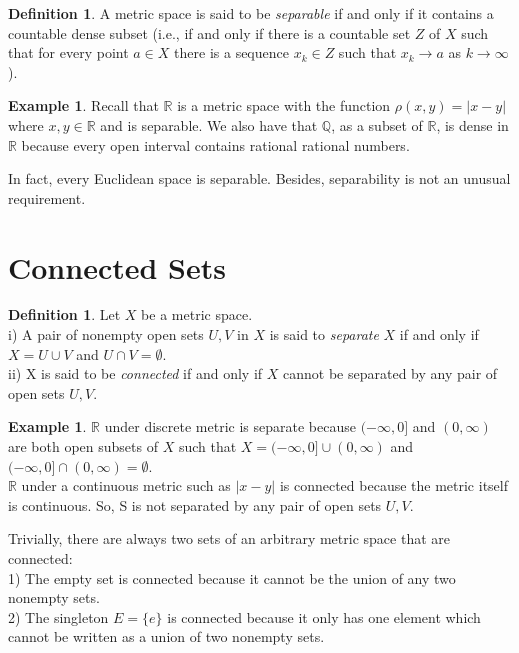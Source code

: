 \documentclass[12pt, reqno]{amsart}
\theoremstyle{definition}
\newtheorem{definition}[theorem]{Definition}
\newtheorem{example}[theorem]{Example}
\numberwithin{equation}{section}
\newcommand{\dR}{{\mathbb R}}
\newcommand{\dQ}{{\mathbb Q}}
\begin{document}
\begin{definition}\cite{s1}
    A metric space is said to be \textit{separable} if and only if it contains a countable dense subset (i.e., if and only if there is a countable set $Z$ of $X$ such that for every point $a \in X$ there is a sequence $x_k \in Z$ such that $x_k \rightarrow a$ as $k \rightarrow \infty$).
\end{definition}

\begin{example}
Recall that $\dR$ is a metric space with the function $\rho(x,y) = |x-y|$ where $x, y \in \dR$ and is separable. We also have that $\dQ$, as a subset of $\dR$, is dense in $\dR$ because every open interval contains rational rational numbers.
\end{example}
In fact, every Euclidean space is separable. Besides, separability is not an unusual requirement.

\section{Connected Sets}
\begin{definition}  \label{connected set}\cite{s1}
    Let $X$ be a metric space.\\
    i) A pair of nonempty open sets $U, V$ in $X$ is said to \textit{separate} $X$ if and only if $X=U \cup V$ and $U \cap V = \emptyset.$\\
    ii) X is said to be \textit{connected} if and only if $X$ cannot be separated by any pair of open sets $U,V$.
\end{definition}
\begin{example}
$\dR$ under discrete metric is separate because $(-\infty, 0]$ and $(0, \infty)$ are both open subsets of $X$ such that $X=(-\infty, 0] \cup (0, \infty)$ and $(-\infty, 0] \cap (0, \infty) = \emptyset$.\\
$\dR$ under a continuous metric such as $|x-y|$ is connected because the metric itself is continuous. So, S is not separated by any pair of open sets $U,V$.
\end{example}
Trivially, there are always two sets of an arbitrary metric space that are connected:\\
1) The empty set is connected because it cannot be the union of any two nonempty sets.\\
2) The singleton $E =\{e\}$ is connected because it only has one element which cannot be written as a union of two nonempty sets.
\end{document}
